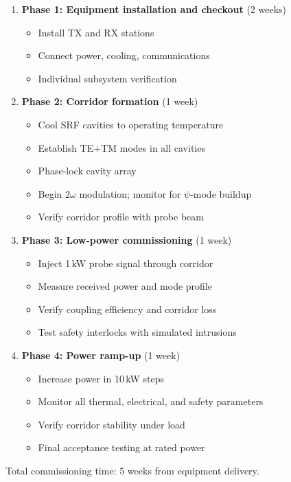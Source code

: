 \documentclass[11pt,a4paper]{article}
\begin{document}
\begin{enumerate}
\item \textbf{Phase 1: Equipment installation and checkout} (2 weeks)
    \begin{itemize}
    \item Install TX and RX stations
    \item Connect power, cooling, communications
    \item Individual subsystem verification
    \end{itemize}

\item \textbf{Phase 2: Corridor formation} (1 week)
    \begin{itemize}
    \item Cool SRF cavities to operating temperature
    \item Establish TE+TM modes in all cavities
    \item Phase-lock cavity array
    \item Begin $2\omega$ modulation; monitor for $\psi$-mode buildup
    \item Verify corridor profile with probe beam
    \end{itemize}

\item \textbf{Phase 3: Low-power commissioning} (1 week)
    \begin{itemize}
    \item Inject 1\,kW probe signal through corridor
    \item Measure received power and mode profile
    \item Verify coupling efficiency and corridor loss
    \item Test safety interlocks with simulated intrusions
    \end{itemize}

\item \textbf{Phase 4: Power ramp-up} (1 week)
    \begin{itemize}
    \item Increase power in 10\,kW steps
    \item Monitor all thermal, electrical, and safety parameters
    \item Verify corridor stability under load
    \item Final acceptance testing at rated power
    \end{itemize}
\end{enumerate}

Total commissioning time: 5 weeks from equipment delivery.
\end{document}
